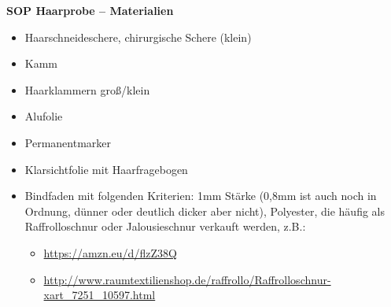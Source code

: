 \begin{center}
{\Large \textbf{SOP Haarprobe -- Materialien}}
\end{center}
\vspace*{1cm}
\begin{itemize}
  \item Haarschneideschere, chirurgische Schere (klein)
  \item Kamm
  \item Haarklammern groß/klein
  \item Alufolie
  \item Permanentmarker
  \item Klarsichtfolie mit Haarfragebogen
  \item Bindfaden mit folgenden Kriterien: 1mm Stärke (0,8mm ist auch noch in Ordnung, dünner oder deutlich dicker aber nicht), Polyester, die häufig als Raffrolloschnur oder Jalousieschnur verkauft werden, z.B.:
    \begin{itemize}
    \item \url{https://amzn.eu/d/flzZ38Q}
    \item \url{http://www.raumtextilienshop.de/raffrollo/Raffrolloschnur-xart_7251_10597.html}
    \end{itemize}
\end{itemize}
